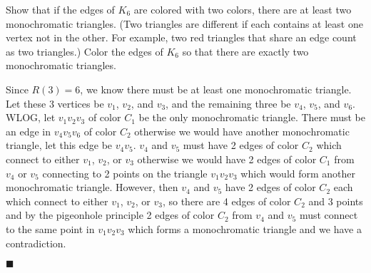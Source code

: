 \documentclass[12pt]{article}
\renewcommand{\qed}{\hfill$\blacksquare$}
\renewenvironment{proof}{\vspace{1em}\begin{addmargin}[2em]{0em}\begin{newproof}}{\end{newproof}\end{addmargin}\qed}
\newenvironment{exercise}[2][Exercise]{\begin{trivlist}
\item[\hskip \labelsep {\bfseries #1} \hskip \labelsep {\bfseries #2}]}{\end{trivlist}}
\begin{document}
\begin{exercise}{1.6.7. (3pt)}
	Show that if the edges of $K_6$ are colored with two colors, there are at least two monochromatic triangles. (Two triangles are different if each contains at least one vertex not in the other. For example, two red triangles that share an edge count as two triangles.) Color the edges of $K_6$ so that there are exactly two monochromatic triangles. 
\end{exercise}
\begin{proof}
	Since $R(3) = 6$, we know there must be at least one monochromatic triangle. Let these 3 vertices be $v_1$, $v_2$, and $v_3$, and the remaining three be $v_4$, $v_5$, and $v_6$. WLOG, let $v_1v_2v_3$ of color $C_1$ be the only monochromatic triangle. There must be an edge in $v_4v_5v_6$ of color $C_2$ otherwise we would have another monochromatic triangle, let this edge be $v_4v_5$. $v_4$ and $v_5$ must have 2 edges of color $C_2$ which connect to either $v_1$, $v_2$, or $v_3$ otherwise we would have 2 edges of color $C_1$ from $v_4$ or $v_5$ connecting to 2 points on the triangle $v_1v_2v_3$ which would form another monochromatic triangle. However, then $v_4$ and $v_5$ have 2 edges of color $C_2$ each which connect to either $v_1$, $v_2$, or $v_3$, so there are 4 edges of color $C_2$ and 3 points and by the pigeonhole principle 2 edges of color $C_2$ from $v_4$ and $v_5$ must connect to the same point in $v_1v_2v_3$ which forms a monochromatic triangle and we have a contradiction. 
\begin{center}
\end{center}
\end{proof}
\end{document}

